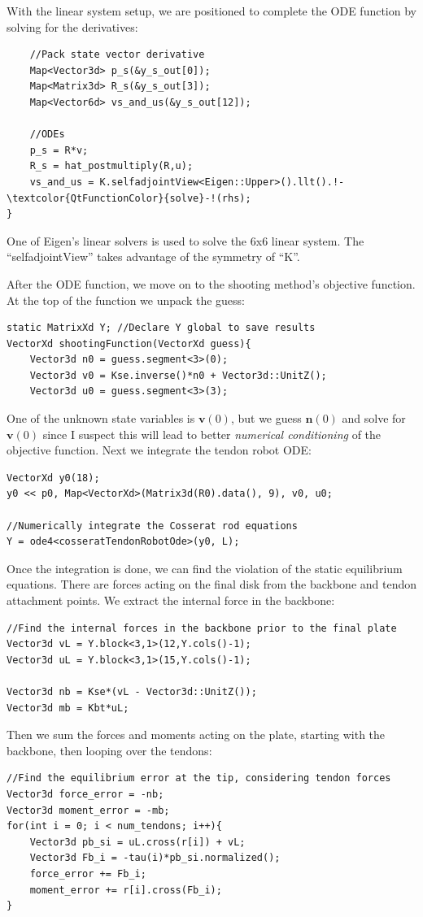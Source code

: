\documentclass[12pt]{article}
\begin{document}
\newpage \noindent
With the linear system setup, we are positioned to complete the ODE function by solving for the derivatives:
\begin{lstlisting}
    //Pack state vector derivative
    Map<Vector3d> p_s(&y_s_out[0]);
    Map<Matrix3d> R_s(&y_s_out[3]);
    Map<Vector6d> vs_and_us(&y_s_out[12]);

    //ODEs
    p_s = R*v;
    R_s = hat_postmultiply(R,u);
    vs_and_us = K.selfadjointView<Eigen::Upper>().llt().!-\textcolor{QtFunctionColor}{solve}-!(rhs);
}
\end{lstlisting}
One of Eigen's linear solvers is used to solve the 6x6 linear system. The ``selfadjointView'' takes advantage of the symmetry of ``K''.

After the ODE function, we move on to the shooting method's objective function. At the top of the function we unpack the guess:
\begin{lstlisting}
static MatrixXd Y; //Declare Y global to save results
VectorXd shootingFunction(VectorXd guess){
    Vector3d n0 = guess.segment<3>(0);
    Vector3d v0 = Kse.inverse()*n0 + Vector3d::UnitZ();
    Vector3d u0 = guess.segment<3>(3);
\end{lstlisting}
One of the unknown state variables is $\boldsymbol{v}(0)$, but we guess $\boldsymbol{n}(0)$ and solve for $\boldsymbol{v}(0)$ since I suspect this will lead to better \emph{numerical conditioning} of the objective function. Next we integrate the tendon robot ODE:
\begin{lstlisting}
VectorXd y0(18);
y0 << p0, Map<VectorXd>(Matrix3d(R0).data(), 9), v0, u0;

//Numerically integrate the Cosserat rod equations
Y = ode4<cosseratTendonRobotOde>(y0, L);
\end{lstlisting}
Once the integration is done, we can find the violation of the static equilibrium equations. There are forces acting on the final disk from the backbone and tendon attachment points. We extract the internal force in the backbone:
\begin{lstlisting}
//Find the internal forces in the backbone prior to the final plate
Vector3d vL = Y.block<3,1>(12,Y.cols()-1);
Vector3d uL = Y.block<3,1>(15,Y.cols()-1);

Vector3d nb = Kse*(vL - Vector3d::UnitZ());
Vector3d mb = Kbt*uL;
\end{lstlisting}
Then we sum the forces and moments acting on the plate, starting with the backbone, then looping over the tendons:
\begin{lstlisting}
//Find the equilibrium error at the tip, considering tendon forces
Vector3d force_error = -nb;
Vector3d moment_error = -mb;
for(int i = 0; i < num_tendons; i++){
    Vector3d pb_si = uL.cross(r[i]) + vL;
    Vector3d Fb_i = -tau(i)*pb_si.normalized();
    force_error += Fb_i;
    moment_error += r[i].cross(Fb_i);
}
\end{lstlisting}
\end{document}
